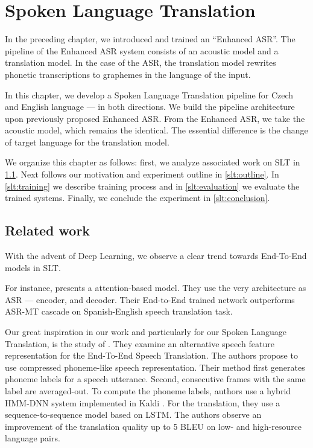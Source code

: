 \chapter{Spoken Language Translation}
\label{chap:slt}
In the preceding chapter, we introduced and trained an ``Enhanced ASR''. The pipeline of the Enhanced ASR system consists of an acoustic model and a translation model. In the case of the ASR, the translation model rewrites phonetic transcriptions to graphemes in the language of the input. 

In this chapter, we develop a Spoken Language Translation pipeline for Czech and English language --- in both directions. We build the pipeline architecture upon previously proposed Enhanced ASR. From the Enhanced ASR, we take the acoustic model, which remains the identical. The essential difference is the change of target language for the translation model. 

We organize this chapter as follows: first, we analyze associated work on SLT in \cref{slt:related}. Next follows our motivation and experiment outline in \cref{slt:outline}. In \cref{slt:training} we describe training process and in \cref{slt:evaluation} we evaluate the trained systems. Finally, we conclude the experiment in \cref{slt:conclusion}.

\section{Related work}
\label{slt:related}

With the advent of Deep Learning, we observe a clear trend towards End-To-End models in SLT.

For instance,  presents a attention-based model. They use the very architecture as ASR --- encoder, and decoder. Their End-to-End trained network outperforms ASR-MT cascade on Spanish-English speech translation task.

Our great inspiration in our work and particularly for our Spoken Language Translation, is the study of . They examine an alternative speech feature representation for the End-To-End Speech Translation. The authors propose to use compressed phoneme-like speech representation. Their method first generates phoneme labels for a speech utterance. Second, consecutive frames with the same label are averaged-out. To compute the phoneme labels, authors use a hybrid HMM-DNN system implemented in Kaldi . For the translation, they use a sequence-to-sequence model based on LSTM. The authors observe an improvement of the translation quality up to 5 BLEU on low- and high-resource language pairs.


